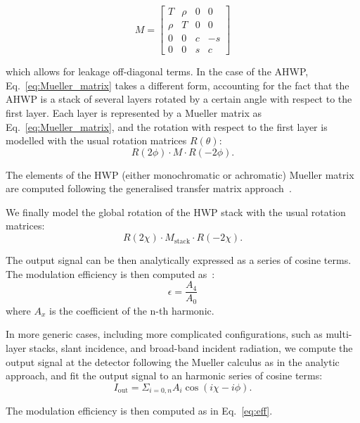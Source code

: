 \begin{equation}
M=\begin{bmatrix}
   T  &\rho  &0  &0\\
   \rho  &T  &0  &0\\
   0  &0  &c  &-s\\
   0  &0  &s  &c
\end{bmatrix}
\label{eq:Mueller_Matrix}
\end{equation}

which allows for leakage off-diagonal terms. In the case of the AHWP, Eq.~\ref{eq:Mueller_matrix} takes a different form, accounting for the fact that the AHWP is a stack of several layers rotated by a certain angle with respect to the first layer. Each layer is represented by a Mueller matrix as Eq.~\ref{eq:Mueller_matrix}, and the rotation with respect to the first layer is modelled with the usual rotation matrices $R(\theta)$:
\begin{equation}
R{(2\phi)}\cdot M \cdot R(-2\phi).
\end{equation} 

The elements of the HWP (either monochromatic or achromatic) Mueller matrix are computed following the generalised transfer matrix approach~\cite{Essinger-Hileman_TM}. 

We finally model the global rotation of the HWP stack with the usual rotation matrices:
\begin{equation}
R{(2\chi)}\cdot M_\mathrm{stack} \cdot R(-2\chi).
\end{equation}

The output signal can be then analytically expressed as a series of cosine terms. The modulation efficiency is then computed as~\cite{Hanany:2005vx,Matsumura:2008zx}:
\begin{equation}\label{eq:eff}
\epsilon=\frac{A_4}{A_0}
\end{equation}
where $A_x$ is the coefficient of the n-th harmonic.

In more generic cases, including more complicated configurations, such as multi-layer stacks, slant incidence, and broad-band incident radiation, we compute the output signal at the detector following the Mueller calculus as in the analytic approach, and fit the output signal to an harmonic series of cosine terms:
\begin{equation}
I_\mathrm{out}=\Sigma_{i=0,n} A_i \cos(i\chi-i\phi).
\end{equation}

The modulation efficiency is then computed as in Eq.~\ref{eq:eff}. %

